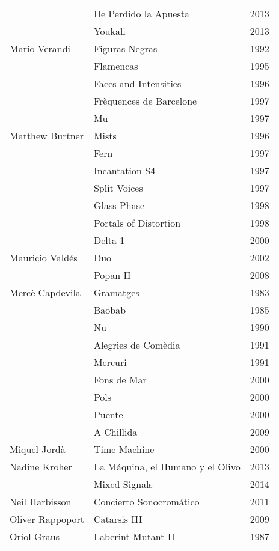 \begin{center}
\begin{longtable}{ p{}  p{}  p{} }
& He Perdido la Apuesta & 2013 \\ \cmidrule (r){2-3} 
& Youkali & 2013 \\ \midrule 
Mario Verandi & Figuras Negras & 1992 \\ \cmidrule (r){2-3} 
& Flamencas & 1995 \\ \cmidrule (r){2-3} 
& Faces and Intensities & 1996 \\ \cmidrule (r){2-3} 
& Frèquences de Barcelone & 1997 \\ \cmidrule (r){2-3} 
& Mu & 1997 \\ \midrule 
Matthew Burtner & Mists & 1996 \\ \cmidrule (r){2-3} 
& Fern & 1997 \\ \cmidrule (r){2-3} 
& Incantation S4 & 1997 \\ \cmidrule (r){2-3} 
& Split Voices & 1997 \\ \cmidrule (r){2-3} 
& Glass Phase & 1998 \\ \cmidrule (r){2-3} 
& Portals of Distortion & 1998 \\ \cmidrule (r){2-3} 
& Delta 1 & 2000 \\ \midrule 
Mauricio Valdés & Duo & 2002 \\ \cmidrule (r){2-3} 
& Popan II & 2008 \\ \midrule 
Mercè Capdevila & Gramatges & 1983 \\ \cmidrule (r){2-3} 
& Baobab & 1985 \\ \cmidrule (r){2-3} 
& Nu & 1990 \\ \cmidrule (r){2-3} 
& Alegries de Comèdia & 1991 \\ \cmidrule (r){2-3} 
& Mercuri & 1991 \\ \cmidrule (r){2-3} 
& Fons de Mar & 2000 \\ \cmidrule (r){2-3} 
& Pols & 2000 \\ \cmidrule (r){2-3} 
& Puente & 2000 \\ \cmidrule (r){2-3} 
& A Chillida & 2009 \\ \midrule 
Miquel Jordà & Time Machine & 2000 \\ \midrule 
Nadine Kroher & La Máquina, el Humano y el Olivo & 2013 \\ \cmidrule (r){2-3} 
& Mixed Signals & 2014 \\ \midrule 
Neil Harbisson & Concierto Sonocromático & 2011 \\ \midrule 
Oliver Rappoport & Catarsis III & 2009 \\ \midrule 
Oriol Graus & Laberint Mutant II & 1987 \\ \cmidrule (r){2-3} 

\end{longtable}
\end{center}
